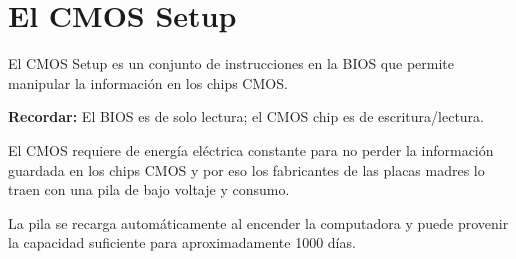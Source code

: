 \documentclass[12pt,oneside,a4paper]{article}
\begin{document}






	

	\newpage
\section{El CMOS Setup}{\label{sec:cmossetup}}

	El CMOS Setup es un conjunto de instrucciones en la BIOS que permite
	manipular la información en los chips CMOS.

	{\bf Recordar:} El BIOS es de solo lectura; el CMOS chip es de escritura/lectura.

	El CMOS requiere de energía eléctrica constante para no perder la
	información guardada en los chips CMOS y por eso los fabricantes de las
	placas madres lo traen con una pila de bajo voltaje y consumo.

	La pila se recarga automáticamente al encender la computadora y puede
	provenir la capacidad suficiente para aproximadamente 1000 días.
\end{document}

